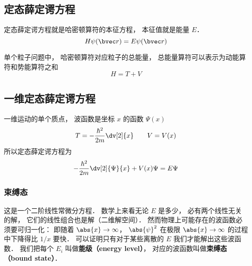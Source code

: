 
\begin{issues}
\issueTODO
\issueAbstract
\end{issues}


\subsection{定态薛定谔方程}
定态薛定谔方程就是哈密顿算符的本征方程， 本征值就是能量 $E$．
\begin{equation}
H \psi(\bvec r) = E \psi(\bvec r)
\end{equation}

单个粒子问题中， 哈密顿算符对应粒子的总能量， 总能量算符可以表示为动能算符和势能算符之和
\begin{equation}
H = T + V
\end{equation}

\subsection{一维定态薛定谔方程}

一维运动的单个质点， 波函数是坐标 $x$ 的函数 $\Psi(x)$
\begin{equation}
T = -\frac{\hbar^2}{2m} \dv[2]{x} \qquad V = V(x)
\end{equation}
所以定态薛定谔方程为
\begin{equation}\label{SchEq_eq1}
-\frac{\hbar^2}{2m} \dv[2]{\Psi}{x} + V(x)\Psi = E \Psi
\end{equation}

\subsubsection{束缚态}
这是一个二阶线性常微分方程． 数学上来看无论 $E$ 是多少， 必有两个线性无关的解， 它们的线性组合也是解（二维解空间）． 然而物理上可能存在的波函数必须要可归一化： 即随着 $\abs{x} \to \infty$，  $\abs{\psi}^2$ 在极限 $\abs{x}\to\infty$ 的过程中下降得比 $1/x$ 要快． 可以证明只有对于某些离散的 $E$ 我们才能解出这些波函数． 我们把每个 $E_i$ 叫做\textbf{能级（energy level）}， 对应的波函数叫做\textbf{束缚态（bound state）}．

